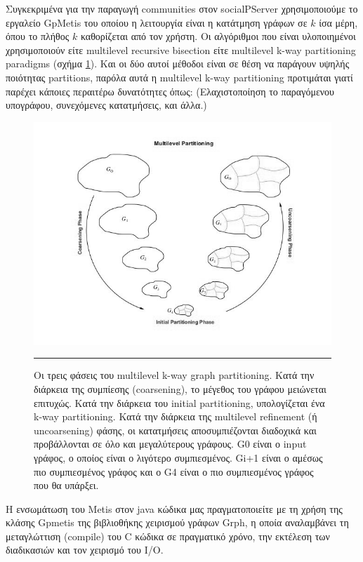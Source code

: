Συγκεκριμένα για την παραγωγή communities στον socialPServer χρησιμοποιούμε το εργαλείο GpMetis του οποίου η λειτουργία είναι η κατάτμηση γράφων σε
$k$ ίσα μέρη, όπου το πλήθος $k$ καθορίζεται από τον χρήστη. Οι αλγόριθμοι που είναι υλοποιημένοι χρησιμοποιούν είτε multilevel recursive bisection
είτε multilevel k-way partitioning paradigms (σχήμα \ref{fig:metisFig}). Και οι δύο αυτοί μέθοδοι είναι σε θέση να παράγουν υψηλής ποιότητας partitions, παρόλα αυτά η multilevel k-way partitioning 
προτιμάται γιατί παρέχει κάποιες περαιτέρω δυνατότητες όπως:
(Ελαχιστοποίηση το παραγόμενου υπογράφου, συνεχόμενες κατατμήσεις, και άλλα.) 
\cite{karypisΜetis}


\begin{figure}[htbp]
  \begin{center}
    \hspace{-3.5em}
      \includegraphics[scale=0.59]{Figures/metis.jpg}
	\rule{35em}{0.6pt}  %
    \caption[METIS-]{Οι τρεις φάσεις του multilevel k-way graph partitioning. Κατά την διάρκεια της συμπίεσης (coarsening), το μέγεθος του γράφου μειώνεται επιτυχώς.
    Κατά την διάρκεια του initial partitioning, υπολογίζεται ένα k-way partitioning. Κατά την διάρκεια της multilevel refinement (ή
    uncoarsening) φάσης, οι κατατμήσεις αποσυμπιέζονται διαδοχικά και προβάλλονται σε όλο και μεγαλύτερους γράφους. G0 είναι ο input γράφος, ο οποίος είναι ο λιγότερο συμπιεσμένος.
    Gi+1 είναι ο αμέσως πιο συμπιεσμένος γράφος και ο G4 είναι ο πιο συμπιεσμένος γράφος που θα υπάρξει. \cite{karypisΜetis}}
  \label{fig:metisFig}
  \end{center}
\end{figure}

    
Η ενσωμάτωση του Metis στον java κώδικα μας πραγματοποιείτε με τη χρήση της κλάσης Gpmetis \cite{GpMetis} της βιβλιοθήκης χειρισμού γράφων Grph,
η οποία αναλαμβάνει τη μεταγλώττιση (compile) του C κώδικα σε πραγματικό χρόνο, την εκτέλεση των διαδικασιών και τον χειρισμό του Ι/Ο.

